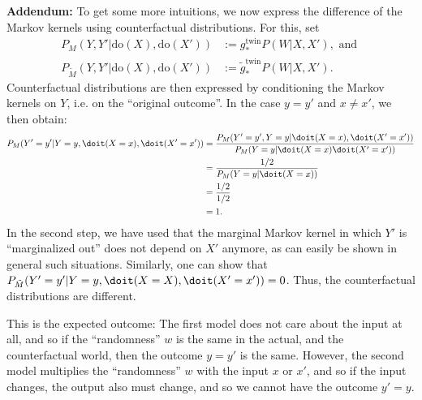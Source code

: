 \begin{enumerate}[label=12.\arabic*]
\begin{gradedsolution}
\begin{enumerate}
			\textbf{Addendum:} To get some more intuitions, we now express the difference of the Markov kernels using counterfactual distributions.
			For this, set
			\begin{align*}
				P_{M}(Y, Y' | \text{do}(X), \text{do}(X'))         & := g_{*}^{\text{twin}}P(W | X, X'), \text{ and } \\
				P_{\tilde{M}}(Y, Y' | \text{do}(X), \text{do}(X')) & :=  \tilde{g}_*^{\text{twin}}P(W | X, X').
			\end{align*}
			Counterfactual distributions are then expressed by conditioning the Markov kernels on $Y$, i.e. on the ``original outcome''.
			In the case $y = y'$ and $x \neq x'$, we then obtain:
			\begin{align*}
				P_{M}(Y' = y' | Y = y, \doit(X = x), \doit(X' = x')) & = \frac{P_{M}(Y' = y', Y = y | \doit(X = x), \doit(X' = x'))}{P_{M}(Y = y | \doit(X = x) \doit(X ' = x'))} \\
				                                                     & = \frac{1/2}{P_{M}(Y = y | \doit(X = x))}                                                                  \\
				                                                     & = \frac{1/2}{1/2}                                                                                          \\
				                                                     & = 1.
			\end{align*}
			In the second step, we have used that the marginal Markov kernel in which $Y'$ is ``marginalized out'' does not depend on $X'$ anymore, as can easily be shown in general such situations.
			Similarly, one can show that $P_{\tilde{M}}(Y' = y' | Y = y, \doit(X = X), \doit(X' = x')) = 0$.
			Thus, the counterfactual distributions are different.

			This is the expected outcome: The first model does not care about the input at all, and so if the ``randomness'' $w$ is the same in the actual, and the counterfactual world, then the outcome $y = y'$ is the same.
			However, the second model multiplies the ``randomness'' $w$ with the input $x$ or $x'$, and so if the input changes, the output also must change, and so we cannot have the outcome $y' = y$.



\end{enumerate}
\end{gradedsolution}
\end{enumerate}
